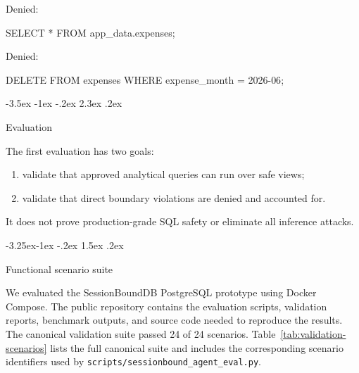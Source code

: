 \documentclass[10pt,twocolumn]{article}
\makeatletter
\newenvironment{Shaded}{}{}
\newcommand{\KeywordTok}[1]{\textcolor[rgb]{0.00,0.44,0.13}{#1}}
\newcommand{\NormalTok}[1]{#1}
\newcommand{\OperatorTok}[1]{\textcolor[rgb]{0.40,0.40,0.40}{#1}}
\newcommand{\StringTok}[1]{\textcolor[rgb]{0.25,0.44,0.63}{#1}}
\providecommand{\tightlist}{%
  \setlength{\itemsep}{0pt}\setlength{\parskip}{0pt}}
\renewcommand\section{\@startsection{section}{1}{\z@}%
  {-3.5ex \@plus -1ex \@minus -.2ex}%
  {2.3ex \@plus .2ex}%
  {\normalfont\Large\bfseries\raggedright}}
\renewcommand\subsection{\@startsection{subsection}{2}{\z@}%
  {-3.25ex\@plus -1ex \@minus -.2ex}%
  {1.5ex \@plus .2ex}%
  {\normalfont\large\bfseries\raggedright}}
\makeatother
\begin{document}
Denied:

\begin{Shaded}
\begin{Highlighting}[]
\KeywordTok{SELECT} \OperatorTok{*} \KeywordTok{FROM}\NormalTok{ app\_data.expenses;}
\end{Highlighting}
\end{Shaded}

Denied:

\begin{Shaded}
\begin{Highlighting}[]
\KeywordTok{DELETE} \KeywordTok{FROM}\NormalTok{ expenses }\KeywordTok{WHERE}\NormalTok{ expense\_month }\OperatorTok{=} \StringTok{\textquotesingle{}2026{-}06\textquotesingle{}}\NormalTok{;}
\end{Highlighting}
\end{Shaded}


\hypertarget{evaluation}{%
\section{Evaluation}\label{evaluation}}

The first evaluation has two goals:

\begin{enumerate}
\def\labelenumi{\arabic{enumi}.}
\tightlist
\item
  validate that approved analytical queries can run over safe views;
\item
  validate that direct boundary violations are denied and accounted for.
\end{enumerate}

It does not prove production-grade SQL safety or eliminate all inference
attacks.

\hypertarget{functional-scenario-suite}{%
\subsection{Functional scenario
suite}\label{functional-scenario-suite}}

We evaluated the SessionBoundDB PostgreSQL prototype using Docker
Compose. The public repository contains the evaluation scripts,
validation reports, benchmark outputs, and source code needed to
reproduce the results. The canonical validation suite passed 24 of 24
scenarios. Table~\ref{tab:validation-scenarios} lists the full canonical
suite and includes the corresponding scenario identifiers used by
\texttt{scripts/sessionbound\_agent\_eval.py}.
\end{document}
